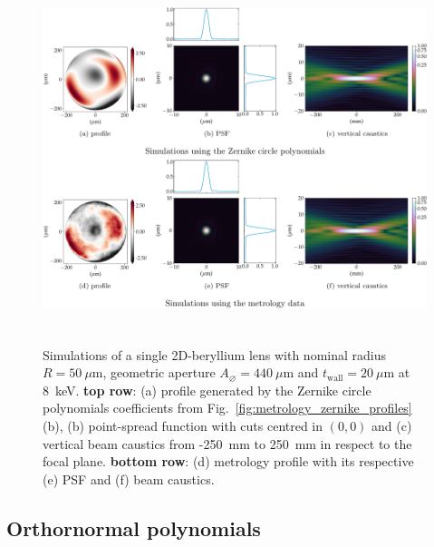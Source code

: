 \begin{refsection}
\begin{figure}[t]
        \centering
        {\includegraphics[height=10cm]{figures/ch04/metrology_zernike_simualtions.pdf}}
        \caption[Effects of other sources of deviations from the parabolic shape]{Simulations of a single 2D-beryllium lens with nominal radius $R=50~\mu\text{m}$, geometric aperture $A_{\diameter}=440~\mu\text{m}$ and $t_\text{wall}=20~\mu$m at 8~keV. \textbf{top row}: (a) profile generated by the Zernike circle polynomials coefficients from Fig.~\ref{fig:metrology_zernike_profiles}(b), (b) point-spread function with cuts centred in $(0,0)$ and (c) vertical beam caustics from -250~mm to 250~mm in respect to the focal plane. \textbf{bottom row}: (d) metrology profile with its respective (e) PSF and (f) beam caustics.} \label{fig:metrology_zernike_simualtions}
\end{figure}

\subsection{Orthornormal polynomials}\label{sec:orthonormal_polynomials}


\end{refsection}
